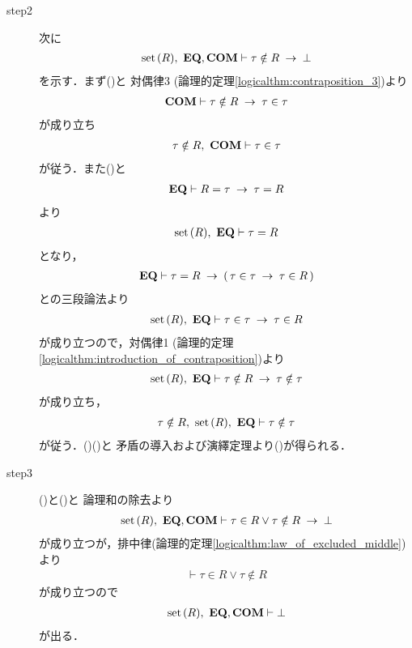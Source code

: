 \begin{sketch}
\begin{description}
			\item[step2]
				次に
				\begin{align}
					\operatorname*{set}\hspace{0.15em}(R),\ \mbox{{\bf EQ}},\mbox{\bf COM} \vdash \tau \notin R \hspace{0.25em}\rightarrow\hspace{0.25em} \bot
					\label{fom:Russell_paradox_5}
				\end{align}
				を示す．まず()と
				対偶律3 (論理的定理\ref{logicalthm:contraposition_3})より
				\begin{align}
					\mbox{\bf COM} \vdash \tau \notin R \hspace{0.25em}\rightarrow\hspace{0.25em} \tau \in \tau
				\end{align}
				が成り立ち
				\begin{align}
					\tau \notin R,\ \mbox{\bf COM} \vdash \tau \in \tau
					\label{fom:Russell_paradox_6}
				\end{align}
				が従う．また()と
				\begin{align}
					\mbox{{\bf EQ}} \vdash R = \tau \hspace{0.25em}\rightarrow\hspace{0.25em} \tau = R
				\end{align}
				より
				\begin{align}
					\operatorname*{set}\hspace{0.15em}(R),\ \mbox{{\bf EQ}} \vdash \tau = R
				\end{align}
				となり，
				\begin{align}
					\mbox{{\bf EQ}} \vdash \tau = R \hspace{0.25em}\rightarrow\hspace{0.25em} (\, \tau \in \tau \hspace{0.25em}\rightarrow\hspace{0.25em} 
					\tau \in R\, )
				\end{align}
				との三段論法より
				\begin{align}
					\operatorname*{set}\hspace{0.15em}(R),\ \mbox{{\bf EQ}} \vdash \tau \in \tau \hspace{0.25em}\rightarrow\hspace{0.25em} \tau \in R
				\end{align}
				が成り立つので，対偶律1 
				(論理的定理\ref{logicalthm:introduction_of_contraposition})より
				\begin{align}
					\operatorname*{set}\hspace{0.15em}(R),\ \mbox{{\bf EQ}} \vdash \tau \notin R \hspace{0.25em}\rightarrow\hspace{0.25em} \tau \notin \tau
				\end{align}
				が成り立ち，
				\begin{align}
					\tau \notin R,\ \operatorname*{set}\hspace{0.15em}(R),\ \mbox{{\bf EQ}} \vdash \tau \notin \tau
					\label{fom:Russell_paradox_7}
				\end{align}
				が従う．()()と
				矛盾の導入および演繹定理より()が得られる．
				
			\item[step3]
				()と()と
				論理和の除去より
				\begin{align}
					\operatorname*{set}\hspace{0.15em}(R),\ \mbox{{\bf EQ}},\mbox{\bf COM} \vdash
					\tau \in R \vee \tau \notin R \hspace{0.25em}\rightarrow\hspace{0.25em} \bot
				\end{align}
				が成り立つが，排中律(論理的定理\ref{logicalthm:law_of_excluded_middle})より
				\begin{align}
					\vdash \tau \in R \vee \tau \notin R
				\end{align}
				が成り立つので
				\begin{align}
					\operatorname*{set}\hspace{0.15em}(R),\ \mbox{{\bf EQ}},\mbox{\bf COM} \vdash \bot
				\end{align}
				が出る．
				\QED
		\end{description}
	\end{sketch}
	
